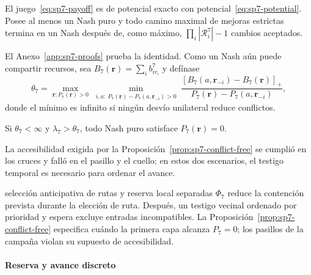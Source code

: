 \begin{teorema}
\label{thm:sp7-exact-potential}
El juego~\eqref{eq:sp7-payoff} es de potencial exacto con potencial~\eqref{eq:sp7-potential}. Posee al menos un Nash puro y todo camino maximal de mejoras estrictas termina en un Nash después de, como máximo, $\prod_i|\mathcal R_i^7|-1$ cambios aceptados.
\end{teorema}

El Anexo~\ref{app:sp7-proofs} prueba la identidad. Como un Nash aún puede compartir recursos, sea $B_7(\boldsymbol r)=\sum_i b_{ir_i}^7$ y defínase
\begin{equation}
\label{eq:sp7-threshold}
 \theta_7=\max_{\boldsymbol r:P_7(\boldsymbol r)>0}
 \min_{\substack{i,a:\ P_7(\boldsymbol r)-P_7(a,\boldsymbol r_{-i})>0}}
 \frac{[B_7(a,\boldsymbol r_{-i})-B_7(\boldsymbol r)]_+}
 {P_7(\boldsymbol r)-P_7(a,\boldsymbol r_{-i})},
\end{equation}
donde el mínimo es infinito si ningún desvío unilateral reduce conflictos.

\begin{proposicion}
\label{prop:sp7-conflict-free}
Si $\theta_7<\infty$ y $\lambda_7>\theta_7$, todo Nash puro satisface $P_7(\boldsymbol r)=0$.
\end{proposicion}

La accesibilidad exigida por la Proposición~\ref{prop:sp7-conflict-free} se cumplió en los cruces y falló en el pasillo y el cuello; en estos dos escenarios, el testigo temporal es necesario para ordenar el avance.

\begin{samepage}
\begin{contribucion}{selección anticipativa de rutas y reserva local separadas}
$\Phi_7$ reduce la contención prevista durante la elección de ruta. Después, un testigo vecinal ordenado por prioridad y espera excluye entradas incompatibles. La Proposición~\ref{prop:sp7-conflict-free} especifica cuándo la primera capa alcanza $P_7=0$; los pasillos de la campaña violan su supuesto de accesibilidad.
\end{contribucion}
\end{samepage}

\paragraph{Reserva y avance discreto}

